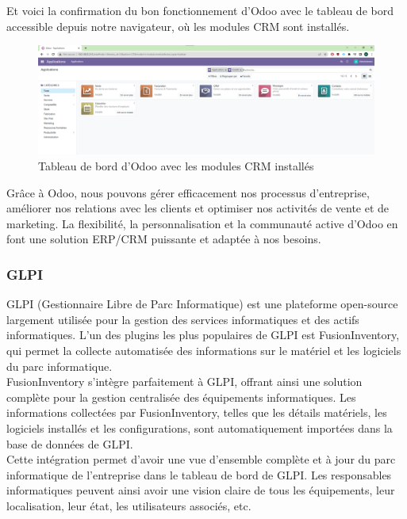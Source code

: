 Et voici la confirmation du bon fonctionnement d'Odoo avec le tableau de bord accessible depuis notre navigateur, où les modules CRM sont installés. \\

\begin{figure}[H]
 \centering
    \includegraphics[width=15cm]{Images/OdooServer2.png}
    \caption{Tableau de bord d'Odoo avec les modules CRM installés}
    \label{fig:odoo-dashboard}
\end{figure}

Grâce à Odoo, nous pouvons gérer efficacement nos processus d'entreprise, améliorer nos relations avec les clients et optimiser nos activités de vente et de marketing. La flexibilité, la personnalisation et la communauté active d'Odoo en font une solution ERP/CRM puissante et adaptée à nos besoins. \\



\subsubsection{GLPI}
GLPI (Gestionnaire Libre de Parc Informatique) est une plateforme open-source largement utilisée pour la gestion des services informatiques et des actifs informatiques. L'un des plugins les plus populaires de GLPI est FusionInventory, qui permet la collecte automatisée des informations sur le matériel et les logiciels du parc informatique. \\

FusionInventory s'intègre parfaitement à GLPI, offrant ainsi une solution complète pour la gestion centralisée des équipements informatiques. Les informations collectées par FusionInventory, telles que les détails matériels, les logiciels installés et les configurations, sont automatiquement importées dans la base de données de GLPI. \\

Cette intégration permet d'avoir une vue d'ensemble complète et à jour du parc informatique de l'entreprise dans le tableau de bord de GLPI. Les responsables informatiques peuvent ainsi avoir une vision claire de tous les équipements, leur localisation, leur état, les utilisateurs associés, etc. \\


